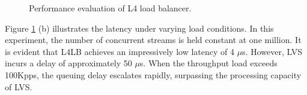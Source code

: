 \begin{figure}[htbp]
	\centering
	
	
	
	\caption{Performance evaluation of L4 load balancer.}
	\label{clicknp:fig:l4}
	
\end{figure}

Figure \ref {clicknp:fig:l4} (b) illustrates the latency under varying load conditions.
In this experiment, the number of concurrent streams is held constant at one million.
It is evident that L4LB achieves an impressively low latency of 4 $\mu$s.
However, LVS incurs a delay of approximately 50 $\mu$s.
When the throughput load exceeds 100Kpps, the queuing delay escalates rapidly, surpassing the processing capacity of LVS.


